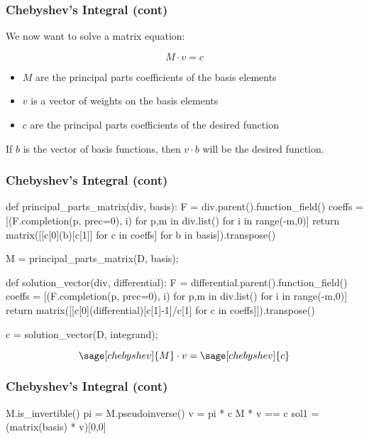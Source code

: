 \documentclass[aspectratio=169,dvipsnames]{beamer}
\begin{document}
\begin{frame}[fragile]
\frametitle{Chebyshev's Integral (cont)}

We now want to solve a matrix equation:

$$M \cdot v = c$$

\begin{itemize}
\item $M$ are the principal parts coefficients of the basis elements
\item $v$ is a vector of weights on the basis elements
\item $c$ are the principal parts coefficients of the desired function
\end{itemize}

If $b$ is the vector of basis functions, then $v\cdot b$ will be the desired function.

\end{frame}

\begin{frame}[fragile]
\frametitle{Chebyshev's Integral (cont)}

\begin{sageblock}[chebyshev]
def principal_parts_matrix(div, basis):
    F = div.parent().function_field()
    coeffs = [(F.completion(p, prec=0), i) for p,m in div.list() for i in range(-m,0)]
    return matrix([[c[0](b)[c[1]] for c in coeffs] for b in basis]).transpose()

M = principal_parts_matrix(D, basis);

def solution_vector(div, differential):
    F = differential.parent().function_field()
    coeffs = [(F.completion(p, prec=0), i) for p,m in div.list() for i in range(-m,0)]
    return matrix([[c[0](differential)[c[1]-1]/c[1] for c in coeffs]]).transpose()

c = solution_vector(D, integrand);
\end{sageblock}

\bigskip
\tiny
\[ \sage[chebyshev]{M} \cdot v = \sage[chebyshev]{c} \]

\end{frame}

\begin{frame}[fragile]
\frametitle{Chebyshev's Integral (cont)}

\begin{sageblock}[chebyshev]
M.is_invertible()
pi = M.pseudoinverse()
v = pi * c
M * v == c
sol1 = (matrix(basis) * v)[0,0]
\end{sageblock}

\end{frame}
\end{document}

